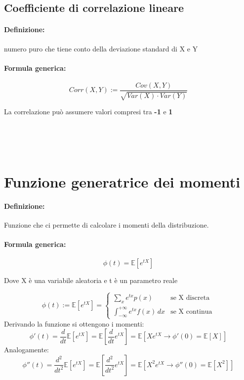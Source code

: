 \documentclass[]{article}
\newcommand{\ev}{\mathbb{E}[X]}
\renewcommand{\ev}[1]{\mathbb{E}[#1]}
\newcommand{\definizione}{\paragraph{Definizione:}}
\newcommand{\formula}{\paragraph{Formula generica:}}
\begin{document}
    \subsection{Coefficiente di correlazione lineare}
    \definizione numero puro che tiene conto della deviazione standard di X e Y
    \formula
    \begin{equation*}
        Corr(X,Y) := \frac{Cov(X,Y)}{\sqrt{Var(X) \cdot Var(Y)}}
    \end{equation*}

    \begin{center}
        La correlazione può assumere valori compresi tra \textbf{-1} e \textbf{1}
    \end{center}
     \\
     \\
     \\

    \newpage
    \section{Funzione generatrice dei momenti}
    \definizione Funzione che ci permette di calcolare i momenti della distribuzione.
    \formula \[ \phi(t) = \ev{e^{tX}}\]

    \centerline{Dove X è una variabile aleatoria e t è un parametro reale}

    \begin{equation*}
        \phi(t) := \ev{e^{tX}} = 
        \displaystyle
        \begin{cases}
            \displaystyle \sum_{x}^{} e^{tx}p(x) & \text{se X discreta} \\
            \displaystyle \int_{-\infty}^{+\infty} e^{tx} f(x) \, dx & \text{se X continua}
        \end{cases}
    \end{equation*}
    \linebreak[10]
    Derivando la funzione si ottengono i momenti:
    \[ \phi'(t) = \frac{d}{dt} \ev{e^{tX}} = \ev{\frac{d}{dt} e^{tX}} = \ev{Xe^{tX} \longrightarrow \phi'(0) = \ev{X}}\]
    \linebreak[10]
    Analogamente:
    \[ \phi''(t) = \frac{d^2}{dt^2} \ev{e^{tX}} = \ev{\frac{d^2}{dt^2} e^{tX}} = \ev{X^2e^{tX} \longrightarrow \phi''(0) = \ev{X^2}}\]
\end{document}
